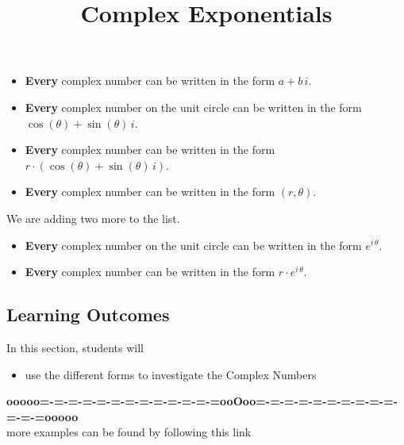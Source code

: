\documentclass{ximera}
\title{Complex Exponentials}
\begin{document}
\begin{abstract}
%
\end{abstract}
\maketitle



\begin{itemize}
\item \textbf{\textcolor{purple!85!blue}{Every}} complex number can be written in the form $a + b \, i$.
\item \textbf{\textcolor{purple!85!blue}{Every}} complex number on the unit circle can be written in the form $\cos(\theta) + \sin(\theta) \, i$.
\item \textbf{\textcolor{purple!85!blue}{Every}} complex number can be written in the form $r \cdot (\cos(\theta) + \sin(\theta) \, i)$.
\item \textbf{\textcolor{purple!85!blue}{Every}} complex number can be written in the form $(r, \theta)$.
\end{itemize}

We are adding two more to the list.



\begin{itemize}
\item \textbf{\textcolor{purple!85!blue}{Every}} complex number on the unit circle can be written in the form $e^{i \, \theta}$.
\item \textbf{\textcolor{purple!85!blue}{Every}} complex number can be written in the form $r \cdot e^{i \, \theta}$.
\end{itemize}






\subsection{Learning Outcomes}

\begin{sectionOutcomes}
In this section, students will 

\begin{itemize}
\item use the different forms to investigate the Complex Numbers
\end{itemize}
\end{sectionOutcomes}










\begin{center}
\textbf{\textcolor{green!50!black}{ooooo=-=-=-=-=-=-=-=-=-=-=-=-=ooOoo=-=-=-=-=-=-=-=-=-=-=-=-=ooooo}} \\

more examples can be found by following this link\\ 

\end{center}
\end{document}
